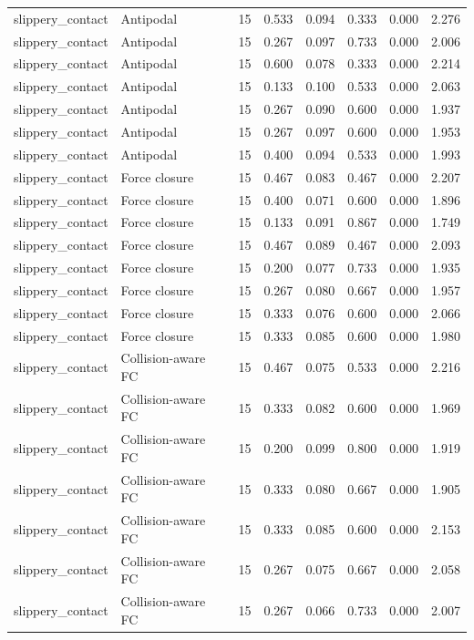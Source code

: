 {\begin{longtable}{llrrrrrr}
slippery\_contact & Antipodal & 15 & 0.533 & 0.094 & 0.333 & 0.000 & 2.276 \\
slippery\_contact & Antipodal & 15 & 0.267 & 0.097 & 0.733 & 0.000 & 2.006 \\
slippery\_contact & Antipodal & 15 & 0.600 & 0.078 & 0.333 & 0.000 & 2.214 \\
slippery\_contact & Antipodal & 15 & 0.133 & 0.100 & 0.533 & 0.000 & 2.063 \\
slippery\_contact & Antipodal & 15 & 0.267 & 0.090 & 0.600 & 0.000 & 1.937 \\
slippery\_contact & Antipodal & 15 & 0.267 & 0.097 & 0.600 & 0.000 & 1.953 \\
slippery\_contact & Antipodal & 15 & 0.400 & 0.094 & 0.533 & 0.000 & 1.993 \\
slippery\_contact & Force closure & 15 & 0.467 & 0.083 & 0.467 & 0.000 & 2.207 \\
slippery\_contact & Force closure & 15 & 0.400 & 0.071 & 0.600 & 0.000 & 1.896 \\
slippery\_contact & Force closure & 15 & 0.133 & 0.091 & 0.867 & 0.000 & 1.749 \\
slippery\_contact & Force closure & 15 & 0.467 & 0.089 & 0.467 & 0.000 & 2.093 \\
slippery\_contact & Force closure & 15 & 0.200 & 0.077 & 0.733 & 0.000 & 1.935 \\
slippery\_contact & Force closure & 15 & 0.267 & 0.080 & 0.667 & 0.000 & 1.957 \\
slippery\_contact & Force closure & 15 & 0.333 & 0.076 & 0.600 & 0.000 & 2.066 \\
slippery\_contact & Force closure & 15 & 0.333 & 0.085 & 0.600 & 0.000 & 1.980 \\
slippery\_contact & Collision-aware FC & 15 & 0.467 & 0.075 & 0.533 & 0.000 & 2.216 \\
slippery\_contact & Collision-aware FC & 15 & 0.333 & 0.082 & 0.600 & 0.000 & 1.969 \\
slippery\_contact & Collision-aware FC & 15 & 0.200 & 0.099 & 0.800 & 0.000 & 1.919 \\
slippery\_contact & Collision-aware FC & 15 & 0.333 & 0.080 & 0.667 & 0.000 & 1.905 \\
slippery\_contact & Collision-aware FC & 15 & 0.333 & 0.085 & 0.600 & 0.000 & 2.153 \\
slippery\_contact & Collision-aware FC & 15 & 0.267 & 0.075 & 0.667 & 0.000 & 2.058 \\
slippery\_contact & Collision-aware FC & 15 & 0.267 & 0.066 & 0.733 & 0.000 & 2.007 \\

\end{longtable}}
